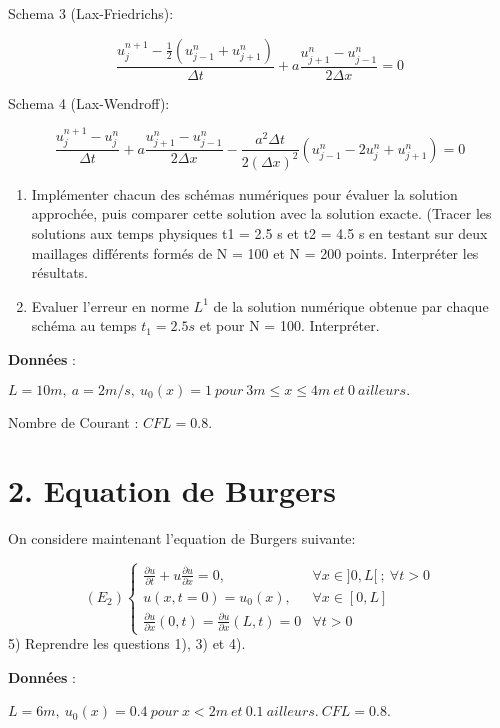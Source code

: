 \documentclass[
]{article}
\begin{document}
Schema 3 (Lax-Friedrichs):

\[
\frac{u_{j}^{n+1}-\frac{1}{2}(u_{j-1}^{n}+u_{j+1}^{n})}{\Delta t} + a\frac{u_{j+1}^{n}-u_{j-1}^{n}}{2\Delta x} = 0
\]

Schema 4 (Lax-Wendroff):

\[
\frac{u_{j}^{n+1}-u_{j}^{n}}{\Delta t} + a\frac{u_{j+1}^{n}-u_{j-1}^{n}}{2\Delta x} - \frac{a^{2}\Delta t}{2(\Delta x)^{2}}(u_{j-1}^{n}-2u_{j}^{n}+u_{j+1}^{n}) = 0
\]

\begin{enumerate}
\def\labelenumi{\arabic{enumi})}
\setcounter{enumi}{2}
\item
  Implémenter chacun des schémas numériques pour évaluer la solution
  approchée, puis comparer cette solution avec la solution exacte.
  (Tracer les solutions aux temps physiques t1 = 2.5 s et t2 = 4.5 s en
  testant sur deux maillages différents formés de N = 100 et N = 200
  points. Interpréter les résultats.
\item
  Evaluer l'erreur en norme \(L^1\) de la solution numérique obtenue par
  chaque schéma au temps \(t_1 = 2.5 s\) et pour N = 100. Interpréter.
\end{enumerate}

\textbf{Données} :

\(L = 10 m ,\  a = 2 m/s , \ u_0(x) = 1\  pour\  3 m \leq x \leq 4 m\  et\  0 \ ailleurs.\)

Nombre de Courant : \(CFL = 0.8\).

\hypertarget{equation-de-burgers}{%
\section{2. Equation de Burgers}\label{equation-de-burgers}}

On considere maintenant l'equation de Burgers suivante:

\[
(E_{2})\left\{
\begin{array}{ll}
\frac{\partial u}{\partial t} + u\frac{\partial u}{\partial x} = 0, & \forall x \in ]0,L[\  ; \ \forall t>0 \\
u(x, t=0) = u_0(x), & \forall x \in [0,L] \\
\frac{\partial u}{\partial x}(0, t)= \frac{\partial u}{\partial x}(L, t)=0 & \forall t > 0
\end{array}
\right.
\] 5) Reprendre les questions 1), 3) et 4).

\textbf{Données} :

\(L = 6m ,\  u_0(x) = 0.4\  pour\  x < 2m \ et \ 0.1\ ailleurs.\ CFL = 0.8\).
\end{document}
